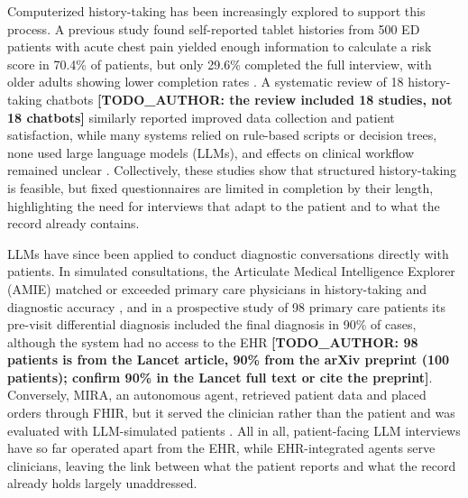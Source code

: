 \documentclass[lineno,pdflatex,sn-basic]{sn-jnl}%
\theoremstyle{thmstyleone}%
\theoremstyle{thmstyletwo}%
\theoremstyle{thmstylethree}%
\begin{document}
Computerized history-taking has been increasingly explored to support this process. A previous study found self-reported tablet histories from 500 ED patients with acute chest pain yielded enough information to calculate a risk score in 70.4\% of patients, but only 29.6\% completed the full interview, with older adults showing lower completion rates \citep{brandbergUseSelfReportedComputerized2021}. A systematic review of 18 history-taking chatbots \textbf{[TODO\_AUTHOR: the review included 18 studies, not 18 chatbots]} similarly reported improved data collection and patient satisfaction, while many systems relied on rule-based scripts or decision trees, none used large language models (LLMs), and effects on clinical workflow remained unclear \citep{hindelangTransformingHealthCare2024}. Collectively, these studies show that structured history-taking is feasible, but fixed questionnaires are limited in completion by their length, highlighting the need for interviews that adapt to the patient and to what the record already contains.

LLMs have since been applied to conduct diagnostic conversations directly with patients. In simulated consultations, the Articulate Medical Intelligence Explorer (AMIE) matched or exceeded primary care physicians in history-taking and diagnostic accuracy \citep{tuConversationalDiagnosticArtificial2025}, and in a prospective study of 98 primary care patients its pre-visit differential diagnosis included the final diagnosis in 90\% of cases, although the system had no access to the EHR \citep{brodeurConversationalDiagnosticArtificial2026} \textbf{[TODO\_AUTHOR: 98 patients is from the Lancet article, 90\% from the arXiv preprint (100 patients); confirm 90\% in the Lancet full text or cite the preprint]}. Conversely, MIRA, an autonomous agent, retrieved patient data and placed orders through FHIR, but it served the clinician rather than the patient and was evaluated with LLM-simulated patients \citep{ferberAutonomousMedicalArtificial2026}. All in all, patient-facing LLM interviews have so far operated apart from the EHR, while EHR-integrated agents serve clinicians, leaving the link between what the patient reports and what the record already holds largely unaddressed.
\end{document}
